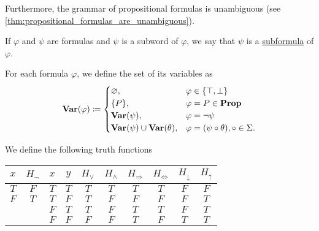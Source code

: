 \begin{definition}
  Furthermore, the grammar of propositional formulas is unambiguous (see \cref{thm:propositional_formulas_are_unambiguous}).

  If $\varphi$ and $\psi$ are formulas and $\psi$ is a subword of $\varphi$, we say that $\psi$ is a \ul{subformula} of $\varphi$.

  For each formula $\varphi$, we define the set of its variables as
  \begin{align*}
    \operatorname{\mathbf{Var}}(\varphi) \coloneqq \begin{cases}
      \varnothing,                              &\varphi \in \{ \top, \bot \} \\
      \{ P \},                                  &\varphi = P \in \operatorname{\mathbf{Prop}} \\
      \operatorname{\mathbf{Var}}(\psi),                         &\varphi = \neg \psi \\
      \operatorname{\mathbf{Var}}(\psi) \cup \operatorname{\mathbf{Var}}(\theta), &\varphi = (\psi \circ \theta), \circ \in \Sigma.
    \end{cases}
  \end{align*}
\end{definition}

\begin{definition}\label{def:truth_functions}
  We define the following truth functions
  \begin{Center}
    \begin{tabular}{c | c || c c | c c c c c c}
      $x$    & $H_\neg$ & $x$    & $y$    & $H_\lor$ & $H_\land$ & $H_\Rightarrow$ & $H_{\iff}$ & $H_\downarrow$ & $H_\uparrow$ \\
      \hline
      $T$    & $F$      & $T$    & $T$    & $T$      & $T$       & $T$          & $T$      & $F$            & $F$    \\
      $F$    & $T$      & $T$    & $F$    & $T$      & $F$       & $F$          & $F$      & $F$            & $T$    \\
             &          & $F$    & $T$    & $T$      & $F$       & $T$          & $T$      & $F$            & $T$    \\
             &          & $F$    & $F$    & $F$      & $F$       & $T$          & $F$      & $T$            & $T$
    \end{tabular}
  \end{Center}
\end{definition}

